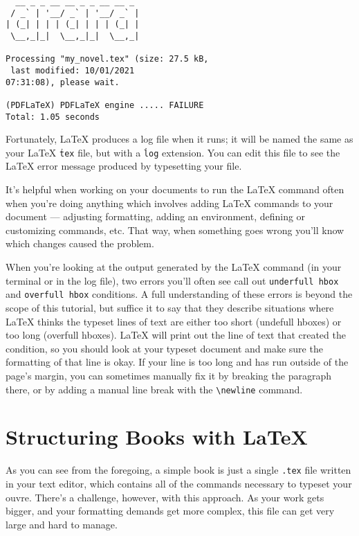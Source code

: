 \begin{verbatim}
  __ _ _ __ __ _ _ __ __ _
 / _` | '__/ _` | '__/ _` |
| (_| | | | (_| | | | (_| |
 \__,_|_|  \__,_|_|  \__,_|

Processing "my_novel.tex" (size: 27.5 kB, 
 last modified: 10/01/2021
07:31:08), please wait.

(PDFLaTeX) PDFLaTeX engine ..... FAILURE
Total: 1.05 seconds
\end{verbatim}

Fortunately, \LaTeX{} produces a log file when it runs; it will be named the
same as your \LaTeX{} \texttt{\.tex} file, but with a \texttt{\.log}
extension. You can edit this file to see the \LaTeX{} error message produced
by typesetting your file.

It's helpful when working on your documents to run the \LaTeX{} command often
when you're doing anything which involves adding \LaTeX{} commands to your
document --- adjusting formatting, adding an environment, defining or
customizing commands, etc. That way, when something goes wrong you'll know
which changes caused the problem.

When you're looking at the output generated by the \LaTeX{} command (in your
terminal or in the log file), two errors you'll often see call out
\texttt{underfull hbox} and \texttt{overfull hbox} conditions. A full
understanding of these errors is beyond the scope of this tutorial, but
suffice it to say that they describe situations where \LaTeX{} thinks the
typeset lines of text are either too short (undefull hboxes) or too long
(overfull hboxes). \LaTeX{} will print out the line of text that created the
condition, so you should look at your typeset document and make sure the
formatting of that line is okay. If your line is too long and has run outside
of the page's margin, you can sometimes manually fix it by breaking the
paragraph there, or by adding a manual line break with the
\texttt{\textbackslash{}newline} command.

\section{Structuring Books with \LaTeX{}} \label{sec:structuring}

As you can see from the foregoing, a simple book is just a single
\texttt{.tex} file written in your text editor, which contains all of the
commands necessary to typeset your ouvre. There's a challenge, however, with
this approach. As your work gets bigger, and your formatting demands get more
complex, this file can get very large and hard to manage.

